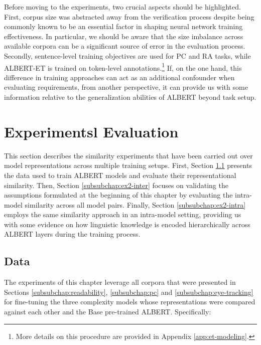 \documentclass[a4paper, nobind]{templates/ociamthesis}
\begin{document}
Before moving to the experiments, two crucial aspects should be highlighted. First, corpus size was abstracted away from the verification process despite being commonly known to be an essential factor in shaping neural network training effectiveness. In particular, we should be aware that the size imbalance across available corpora can be a significant source of error in the evaluation process. Secondly, sentence-level training objectives are used for PC and RA tasks, while ALBERT-ET is trained on token-level annotations.\footnote{More details on this procedure are provided in Appendix \ref{app:et-modeling}.} If, on the one hand, this difference in training approaches can act as an additional confounder when evaluating requirements, from another perspective, it can provide us with some information relative to the generalization abilities of ALBERT beyond task setup.

\hypertarget{subchap:ex2-experiments}{%
\section{Experimentsl Evaluation}\label{subchap:ex2-experiments}}

This section describes the similarity experiments that have been carried out over model representations across multiple training setups. First, Section \ref{subsubchap:ex2-data} presents the data used to train ALBERT models and evaluate their representational similarity. Then, Section \ref{subsubchap:ex2-inter} focuses on validating the assumptions formulated at the beginning of this chapter by evaluating the intra-model similarity across all model pairs. Finally, Section \ref{subsubchap:ex2-intra} employs the same similarity approach in an intra-model setting, providing us with some evidence on how linguistic knowledge is encoded hierarchically across ALBERT layers during the training process.

\hypertarget{subsubchap:ex2-data}{%
\subsection{Data}\label{subsubchap:ex2-data}}

The experiments of this chapter leverage all corpora that were presented in Sections \ref{subsubchap:readability}, \ref{subsubchap:pc} and \ref{subsubchap:eye-tracking} for fine-tuning the three complexity models whose representations were compared against each other and the Base pre-trained ALBERT. Specifically:
\end{document}
